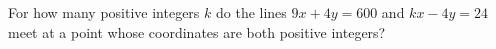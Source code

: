 For how many positive integers $k$ do the lines $9x+4y=600$ and $kx-4y=24$ meet at a point whose coordinates are both positive integers?
